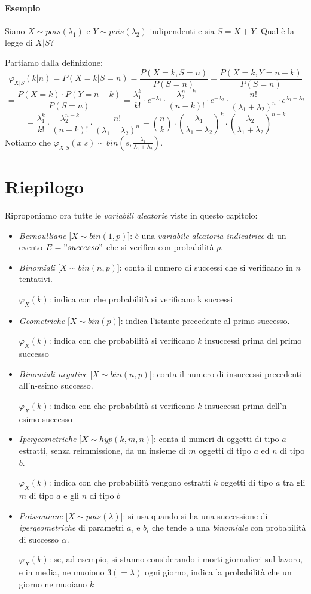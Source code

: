 \documentclass[12pt, a4paper]{report}
\theoremstyle{definition}
\begin{document}
\paragraph*{Esempio}
Siano $X\sim pois(\lambda_1)$ e $Y\sim pois(\lambda_2)$ indipendenti e sia $S=X+Y$.
Qual è la legge di $X|S$?

Partiamo dalla definizione:
\[\varphi_{X|S}(k|n)=P(X=k|S=n)=\frac{P(X=k,S=n)}{P(S=n)}=\frac{P(X=k,Y=n-k)}
{P(S=n)}\]
\[=\frac{P(X=k)\cdot P(Y=n-k)}{P(S=n)}=\frac{\lambda_1^k}{k!}\cdot e^{-\lambda_1}\cdot \frac
{\lambda_2^{n-k}}{(n-k)!}\cdot e^{-\lambda_2}\cdot \frac{n!}{(\lambda_1+\lambda_2)^n}\cdot e^{\lambda_1
+\lambda_2}\]
\[=\frac{\lambda_1^k}{k!}\cdot \frac{\lambda_2^{n-k}}{(n-k)!}\cdot \frac{n!}{(\lambda_1+
\lambda_2)^n}=\binom{n}{k}\cdot \left(\frac{\lambda_1}{\lambda_1+\lambda_2}\right)^k\cdot 
\left(\frac{\lambda_2}{\lambda_1+\lambda_2}\right)^{n-k}\]
Notiamo che \(\varphi_{X|S}(x|s)\sim bin(s, \frac{\lambda_1}{\lambda_1+\lambda_2})\).

\section{Riepilogo}
Riproponiamo ora tutte le \emph{variabili aleatorie} viste in questo capitolo:
\begin{itemize}
	\item \emph{Bernoulliane} [$X\sim bin(1,p)$]: è una \emph{variabile aleatoria
	indicatrice} di un evento $E="successo"$ che si verifica con probabilità $p$.
	\item \emph{Binomiali} [$X\sim bin(n,p)$]: conta il numero di successi che
	si verificano in $n$ tentativi.

	\(\varphi_X(k)\): indica con che probabilità si verificano k successi
	\item \emph{Geometriche} [$X\sim bin(p)$]: indica l'istante precedente al
	primo successo.

	\(\varphi_X(k)\): indica con che probabilità si verificano $k$ insuccessi
	prima del primo successo
	\item \emph{Binomiali negative} [$X\sim bin(n,p)$]: conta il numero di
	insuccessi precedenti all'n-esimo successo.

	\(\varphi_X(k)\): indica con che probabilità si verificano $k$ insuccessi
	prima dell'n-esimo successo
	\item \emph{Ipergeometriche} [$X\sim hyp(k,m,n)$]: conta il numeri di oggetti
	di tipo $a$ estratti, senza reimmissione, da un insieme di $m$ oggetti di tipo
	$a$ ed $n$ di tipo $b$.

	\(\varphi_X(k)\): indica con che probabilità vengono estratti $k$ oggetti
	di tipo $a$ tra gli $m$ di tipo $a$ e gli $n$ di tipo $b$
	\item \emph{Poissoniane} [$X\sim pois(\lambda)$]: si usa quando si ha una
	successione di \emph{ipergeometriche} di parametri $a_i$ e $b_i$ che tende a
	una \emph{binomiale} con probabilità di successo $\alpha$.

	\(\varphi_X(k)\): se, ad esempio, si stanno considerando i morti giornalieri
	sul lavoro, e in media, ne muoiono \(3(=\lambda)\) ogni giorno, indica la
	probabilità che un giorno ne muoiano $k$
\end{itemize}
\end{document}
